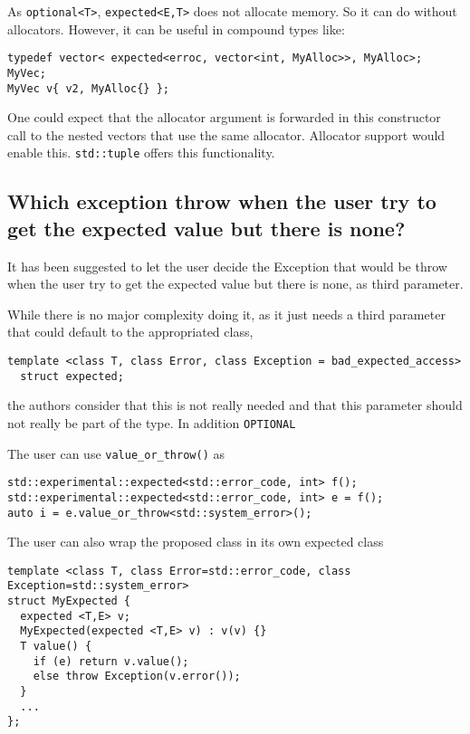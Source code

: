 \documentclass[a4paper,10pt]{article}
\newcommand{\cpp}[1]{\lstinline{#1}}
\begin{document}
As \cpp{optional<T>},  \cpp{expected<E,T>} does not allocate memory. So it can do without allocators. However, it can be useful in compound types like:

\begin{lstlisting}
typedef vector< expected<erroc, vector<int, MyAlloc>>, MyAlloc>; MyVec;
MyVec v{ v2, MyAlloc{} };
\end{lstlisting}

One could expect that the allocator argument is forwarded in this constructor call to the nested vectors that use the same allocator. Allocator support would enable this. \cpp{std::tuple} offers this functionality.

\subsection{Which exception throw when the user try to get the expected value but there is none?}

It has been suggested to let the user decide the Exception that would be throw when the user try to get the expected value but there is none, as third parameter. 

While there is no major complexity doing it, as it just needs a third parameter that could default to the appropriated class, 

\begin{lstlisting}
template <class T, class Error, class Exception = bad_expected_access>
  struct expected;
\end{lstlisting}

the authors consider that this is not really needed and that this parameter should not really be part of the type. In addition \cpp{OPTIONAL}

The user can use \cpp{value_or_throw()} as

\begin{lstlisting}
std::experimental::expected<std::error_code, int> f();
std::experimental::expected<std::error_code, int> e = f();
auto i = e.value_or_throw<std::system_error>();  
\end{lstlisting}

The user can also wrap the proposed class in its own expected class

\begin{lstlisting}
template <class T, class Error=std::error_code, class Exception=std::system_error>
struct MyExpected {
  expected <T,E> v;
  MyExpected(expected <T,E> v) : v(v) {}
  T value() {  
    if (e) return v.value();
    else throw Exception(v.error());
  }
  ...
};
\end{lstlisting}
\end{document}

